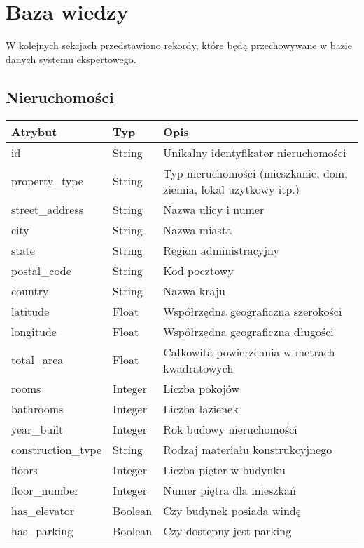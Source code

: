 \section{Baza wiedzy}


W kolejnych sekcjach przedstawiono rekordy, które będą przechowywane w bazie danych systemu ekspertowego.

\subsection{Nieruchomości}
\begin{table}[h]
    \centering
    \begin{tabular}{|l|l|l|}
    \hline
    \textbf{Atrybut} & \textbf{Typ} & \textbf{Opis} \\
    \hline
    id & String & Unikalny identyfikator nieruchomości \\
    property\_type & String & Typ nieruchomości (mieszkanie, dom, ziemia, lokal użytkowy itp.) \\
    street\_address & String & Nazwa ulicy i numer \\
    city & String & Nazwa miasta \\
    state & String & Region administracyjny \\
    postal\_code & String & Kod pocztowy \\
    country & String & Nazwa kraju \\
    latitude & Float & Współrzędna geograficzna szerokości \\
    longitude & Float & Współrzędna geograficzna długości \\
    total\_area & Float & Całkowita powierzchnia w metrach kwadratowych \\
    rooms & Integer & Liczba pokojów  \\
    bathrooms & Integer & Liczba łazienek \\
    year\_built & Integer & Rok budowy nieruchomości \\
    construction\_type & String & Rodzaj materiału konstrukcyjnego \\
    floors & Integer & Liczba pięter w budynku \\
    floor\_number & Integer & Numer piętra dla mieszkań \\
    has\_elevator & Boolean & Czy budynek posiada windę \\
    has\_parking & Boolean & Czy dostępny jest parking \\

\end{tabular}
\end{table}

